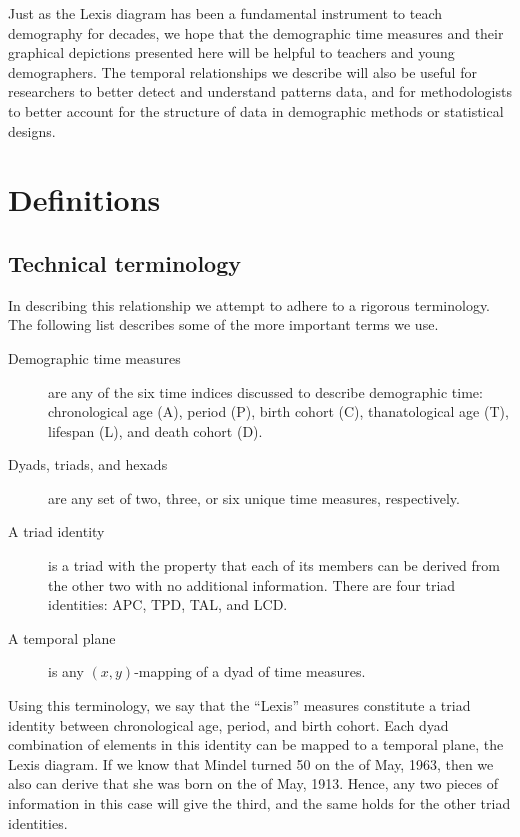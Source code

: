 \documentclass[12pt,oneside,a4paper]{article} %
\begin{document}
Just as the Lexis diagram has been a fundamental instrument to
teach demography for decades, we hope that the demographic time measures and
their graphical depictions presented here will be helpful to teachers and
young demographers. The temporal relationships we describe will also be useful
for researchers to better detect and understand patterns data, and for
methodologists to better account for the structure of data in demographic
methods or statistical designs.

\section{Definitions}
\subsection{Technical terminology}
In describing this relationship we attempt to adhere to a rigorous
terminology.
The following list describes some of the more important terms we use.
\begin{description}
\item[Demographic time measures] are any of the six time indices discussed to
describe demographic time: chronological age (A), period (P), birth cohort (C), thanatological age (T), lifespan (L), and death cohort (D).
\item[Dyads, triads, and hexads] are any set of two, three, or six unique time
measures, respectively.
\item[A triad identity] is a triad with the property that each of its members
can be derived from the other two with no additional information. There are four triad
identities: APC, TPD, TAL, and LCD.
\item[A temporal plane] is any $(x,y)$-mapping of a dyad of time measures.
\end{description}
Using this terminology, we say that the ``Lexis'' measures
constitute a triad identity between chronological age, period, and birth cohort. Each dyad
combination of elements in this identity can be mapped to a
temporal plane, the Lexis diagram. If we know that Mindel turned 50 on the
 of May, 1963, then we also can derive that she was born on the  of
May, 1913. Hence, any two pieces of information in this case will give the
third, and the same holds for the other triad identities.
\end{document}

